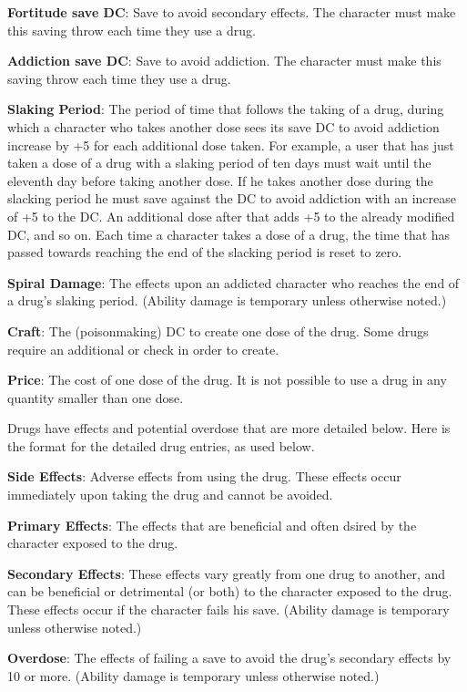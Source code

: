 \textbf{Fortitude save DC}: Save to avoid secondary effects. The character must make this saving throw each time they use a drug.

\textbf{Addiction save DC}: Save to avoid addiction. The character must make this saving throw each time they use a drug.

\textbf{Slaking Period}: The period of time that follows the taking of a drug, during which a character who takes another dose sees its save DC to avoid addiction increase by +5 for each additional dose taken. For example, a user that has just taken a dose of a drug with a slaking period of ten days must wait until the eleventh day before taking another dose. If he takes another dose during the slacking period he must save against the DC to avoid addiction with an increase of +5 to the DC. An additional dose after that adds +5 to the already modified DC, and so on. Each time a character takes a dose of a drug, the time that has passed towards reaching the end of the slacking period is reset to zero.

\textbf{Spiral Damage}: The effects upon an addicted character who reaches the end of a drug's slaking period. (Ability damage is temporary unless otherwise noted.)

\textbf{Craft}: The  (poisonmaking) DC to create one dose of the drug. Some drugs require an additional  or  check in order to create.

\textbf{Price}: The cost of one dose of the drug. It is not possible to use a drug in any quantity smaller than one dose.

Drugs have effects and potential overdose that are more detailed below. Here is the format for the detailed drug entries, as used below.

\textbf{Side Effects}: Adverse effects from using the drug. These effects occur immediately upon taking the drug and cannot be avoided.

\textbf{Primary Effects}: The effects that are beneficial and often dsired by the character exposed to the drug.

\textbf{Secondary Effects}: These effects vary greatly from one drug to another, and can be beneficial or detrimental (or both) to the character exposed to the drug. These effects occur if the character fails his save. (Ability damage is temporary unless otherwise noted.)

\textbf{Overdose}: The effects of failing a save to avoid the drug's secondary effects by 10 or more. (Ability damage is temporary unless otherwise noted.)


